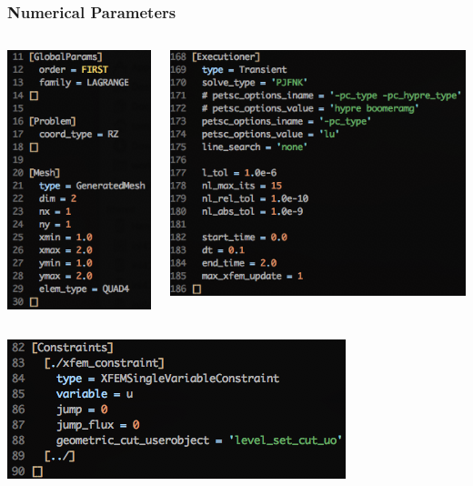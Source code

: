 \documentclass[]{beamer}
\begin{document}
\begin{frame}\frametitle{Numerical Parameters}
  	\begin{columns}
			\begin{center}
			\includegraphics[scale=0.4]{figures/2D_rz_ls1m/Screen-GlobalParams-2Drzls1m}
			\end{center}
			\begin{center}
			\includegraphics[scale=0.4]{figures/2D_rz_ls1m/Screen-Executioner-2Drzls1m}
			\end{center}
	\end{columns}
	\begin{center}
	\includegraphics[scale=0.4]{figures/2D_rz_ls1m/Screen-Constraints-2Drzls1m}
	\end{center}
\end{frame}
\end{document}
